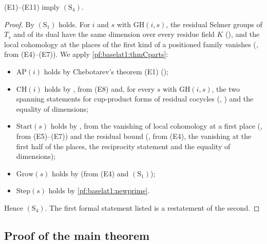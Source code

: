 \begin{theorem}\label{pf:baselat1:boundtwo}
(E1)--(E11) imply $(\mathrm{S}_4)$.
\end{theorem}

\begin{proof}
By  $(\mathrm{S}_1)$ holds. For $i$ and $s$ with $\mathrm{GH}(i,s)$, the
residual Selmer groups of $T_s$ and of its dual have the same dimension over every residue field $K$
(), and the local cohomology at the places of the first kind of
a positioned family vanishes (, from (E4)--(E7)). We apply
\cref{pf:baselat1:thmCparts}:
\begin{itemize}
\item $\mathrm{AP}(i)$ holds by Chebotarev's theorem (E1) ();
\item $\mathrm{CH}(i)$ holds by , from (E8) and, for every $s$ with
  $\mathrm{GH}(i,s)$, the two spanning statements for cup-product forms of residual cocycles
  (, ) and the
  equality of dimensions;
\item $\mathrm{Start}(s)$ holds by , from the vanishing of local
  cohomology at a first place (, from (E5)--(E7)) and the residual bound
  (, from (E4), the vanishing at the first half of the places, the reciprocity
  statement  and the equality of dimensions);
\item $\mathrm{Grow}(s)$ holds by  (from (E4) and $(\mathrm{S}_1)$);
\item $\mathrm{Step}(s)$ holds by \cref{pf:baselat1:newprime}.
\end{itemize}
Hence $(\mathrm{S}_4)$. The first formal statement listed is a restatement of the second.
\end{proof}


\subsection{Proof of the main theorem}\label{pf:baselat1:ssec:main}

